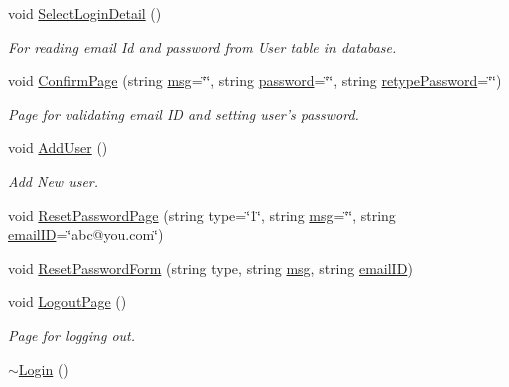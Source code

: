 \begin{DoxyCompactItemize}
void \hyperlink{classLogin_ad127628ca09987d733477f90b828ad1e}{\-Select\-Login\-Detail} ()
\begin{DoxyCompactList}\small\item\em \-For reading email \-Id and password from \-User table in database. \end{DoxyCompactList}\item 
void \hyperlink{classLogin_a79ea5bbaeaa2ec6d21cd3195c522b863}{\-Confirm\-Page} (string \hyperlink{classInputDetail_a1abb16cd695678c3fa05e3c812823fee}{msg}=\char`\"{}\char`\"{}, string \hyperlink{classLogin_a39f7fd03b2b27c927c657ee73e7fcbbc}{password}=\char`\"{}\char`\"{}, string \hyperlink{classLogin_ade36f8943aafce470ef4b8353c79b2c6}{retype\-Password}=\char`\"{}\char`\"{})
\begin{DoxyCompactList}\small\item\em \-Page for validating email \-I\-D and setting user's password. \end{DoxyCompactList}\item 
void \hyperlink{classLogin_ac91737b2085d0b7e8943f49f2d08a0ff}{\-Add\-User} ()
\begin{DoxyCompactList}\small\item\em \-Add \-New user. \end{DoxyCompactList}\item 
void \hyperlink{classLogin_a4c5f4b15cce8b6bf325f35544f512fe2}{\-Reset\-Password\-Page} (string type=\char`\"{}1\char`\"{}, string \hyperlink{classInputDetail_a1abb16cd695678c3fa05e3c812823fee}{msg}=\char`\"{}\char`\"{}, string \hyperlink{classLogin_abea56d6d6403f1e627294f222dd77310}{email\-I\-D}=\char`\"{}abc@you.\-com\char`\"{})
\item 
void \hyperlink{classLogin_aa6978512971283a486347c3aa6ae0478}{\-Reset\-Password\-Form} (string type, string \hyperlink{classInputDetail_a1abb16cd695678c3fa05e3c812823fee}{msg}, string \hyperlink{classLogin_abea56d6d6403f1e627294f222dd77310}{email\-I\-D})
\item 
void \hyperlink{classLogin_a153d72df8d3333317e60219e8f6b8257}{\-Logout\-Page} ()
\begin{DoxyCompactList}\small\item\em \-Page for logging out. \end{DoxyCompactList}\item 
\hyperlink{classLogin_a659bc7233ec12c79b9fa523c1734fbbc}{$\sim$\-Login} ()
\end{DoxyCompactItemize}
